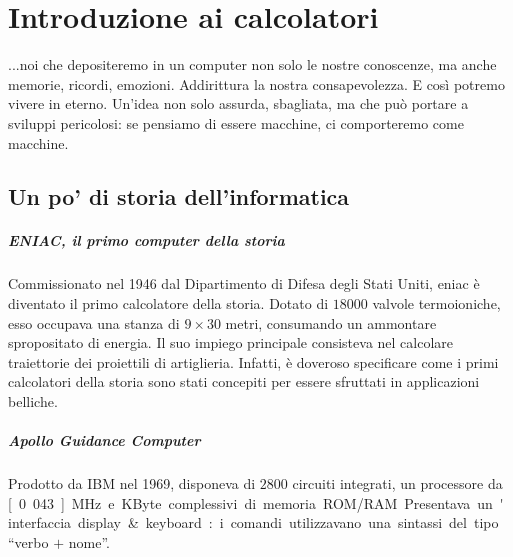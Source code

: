 



\chapter{Introduzione ai calcolatori}\begin{fquote}...noi che depositeremo in un computer non solo le nostre conoscenze, ma anche memorie, ricordi, emozioni. Addirittura la nostra consapevolezza. E così potremo vivere in eterno. Un'idea non solo assurda, sbagliata, ma che può portare a sviluppi pericolosi: se pensiamo di essere macchine, ci comporteremo come macchine.\end{fquote}

\section{Un po' di storia dell'informatica}

\paragraph{ENIAC, il primo computer della storia}
Commissionato nel 1946 dal Dipartimento di Difesa degli Stati Uniti, \acrfull{eniac} è diventato il primo calcolatore della storia.
Dotato di \(18000\) valvole termoioniche, esso occupava una stanza di \(9 \times 30\) metri, consumando un ammontare spropositato di energia.
Il suo impiego principale consisteva nel calcolare traiettorie dei proiettili di artiglieria.
Infatti, è doveroso specificare come i primi calcolatori della storia sono stati concepiti per essere sfruttati in applicazioni belliche.

\paragraph{Apollo Guidance Computer}
Prodotto da IBM nel 1969, disponeva di \(2800\) circuiti integrati, un processore da \unit[0.043]{MHz} e \unit[152]{KByte} complessivi di memoria ROM/RAM.
Presentava un'interfaccia display \& keyboard: i comandi utilizzavano una sintassi del tipo \enquote{verbo \(+\) nome}.

